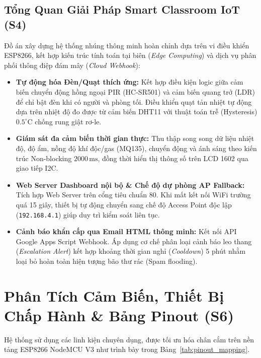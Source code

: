 \documentclass[12pt,a4paper]{article}
\begin{document}
\subsection{Tổng Quan Giải Pháp Smart Classroom IoT (S4)}
Đồ án xây dựng hệ thống nhúng thông minh hoàn chỉnh dựa trên vi điều khiển ESP8266, kết hợp kiến trúc tính toán tại biên (\textit{Edge Computing}) và dịch vụ phân phối thông điệp đám mây (\textit{Cloud Webhook}):
\begin{itemize}
    \item \textbf{Tự động hóa Đèn/Quạt thích ứng:} Kết hợp điều kiện logic giữa cảm biến chuyển động hồng ngoại PIR (HC-SR501) và cảm biến quang trở (LDR) để chỉ bật đèn khi có người và phòng tối. Điều khiển quạt tản nhiệt tự động dựa trên nhiệt độ đo được từ cảm biến DHT11 với thuật toán trễ (Hysteresis) $0.5^\circ\text{C}$ chống rung giật rơ-le.
    \item \textbf{Giám sát đa cảm biến thời gian thực:} Thu thập song song dữ liệu nhiệt độ, độ ẩm, nồng độ khí độc/gas (MQ135), chuyển động và ánh sáng theo kiến trúc Non-blocking $2000\,\text{ms}$, đồng thời hiển thị thông số trên LCD 1602 qua giao tiếp I2C.
    \item \textbf{Web Server Dashboard nội bộ \& Chế độ dự phòng AP Fallback:} Tích hợp Web Server trên cổng tiêu chuẩn 80. Khi mất kết nối WiFi trường quá 15 giây, thiết bị tự động chuyển sang chế độ Access Point độc lập (\texttt{192.168.4.1}) giúp duy trì kiểm soát liên tục.
    \item \textbf{Cảnh báo khẩn cấp qua Email HTML thông minh:} Kết nối API Google Apps Script Webhook. Áp dụng cơ chế phân loại cảnh báo leo thang (\textit{Escalation Alert}) kết hợp khoảng thời gian nghỉ (\textit{Cooldown}) 5 phút nhằm loại bỏ hoàn toàn hiện tượng bão thư rác (Spam flooding).
\end{itemize}

\newpage
\section{Phân Tích Cảm Biến, Thiết Bị Chấp Hành \& Bảng Pinout (S6)}

Hệ thống sử dụng các linh kiện chuyên dụng, được tối ưu hóa chân cắm trên nền tảng ESP8266 NodeMCU V3 như trình bày trong Bảng~\ref{tab:pinout_mapping}.
\end{document}
